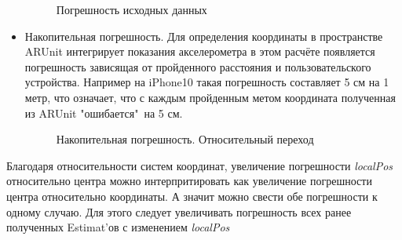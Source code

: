 \documentclass[a4paper, 11pt, titlepage]{article}
\begin{document}
\begin{itemize}
\begin{figure}[H]
\begin{tikzpicture}[scale=0.8]
              \end{tikzpicture}
              \caption{Погрешность исходных данных}
             \end{figure}
             \item Накопительная погрешность. Для определения координаты в пространстве ARUnit интегрирует показания акселерометра
             в этом расчёте появляется погрешность зависящая от пройденного расстояния и пользовательского устройства. 
             Например на iPhone10 такая погрешность составляет 5 см на 1 метр, что означает, что с каждым пройденным метом 
             координата полученная из ARUnit "ошибается"\ на 5 см.
             \begin{figure}[H]
              \centering
              \caption{Накопительная погрешность. Относительный переход}
             \end{figure}
          \end{itemize}
          Благодаря относительности систем координат, увеличение погрешности \textit{localPos} относительно центра можно 
          интерпритировать как увеличение погрешности центра относительно координаты. А значит можно свести обе погрешности к одному случаю.
          Для этого следует увеличивать погрешность всех ранее полученных Estimat'ов с изменением \textit{localPos}
\end{document}
